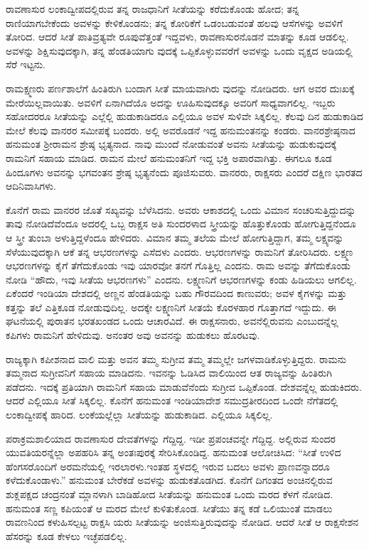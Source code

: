 ರಾವಣಾಸುರ ಲಂಕಾದ್ವೀಪದಲ್ಲಿರುವ ತನ್ನ ರಾಜಧಾನಿಗೆ ಸೀತೆಯನ್ನು ಕರೆದುಕೊಂಡು ಹೋದ; ತನ್ನ ರಾಣಿಯಾಗಬೇಕೆಂದು ಅವಳನ್ನು ಕೇಳಿಕೊಂಡನು; ತನ್ನ ಕೋರಿಕೆಗೆ ಒಡಂಬಡುವಂತೆ ಹಲವು ಆಸೆಗಳನ್ನು ಅವಳಿಗೆ ತೋರಿದ. ಆದರೆ ಸೀತೆ ಪಾತಿವ್ರತ್ಯವೇ ರೂಪುವೆತ್ತಂತೆ ಇದ್ದವಳು, ರಾವಣಾಸುರನೊಡನೆ ಮಾತನ್ನು ಕೂಡ ಆಡಲಿಲ್ಲ. ಅವಳನ್ನು ಶಿಕ್ಷಿಸುವುದಕ್ಕಾಗಿ, ತನ್ನ ಹೆಂಡತಿಯಾಗು ವುದಕ್ಕೆ ಒಪ್ಪಿಕೊಳ್ಳುವವರೆಗೆ ಅವಳನ್ನು ಒಂದು ವೃಕ್ಷದ ಅಡಿಯಲ್ಲಿ ಸೆರೆ ಇಟ್ಟನು.

ರಾಮಕ್ಷ್ಮಣರು ಪರ್ಣಶಾಲೆಗೆ ಹಿಂತಿರುಗಿ ಬಂದಾಗ ಸೀತೆ ಮಾಯವಾಗಿರು ವುದನ್ನು ನೋಡಿದರು. ಆಗ ಅವರ ದುಃಖಕ್ಕೆ ಮೇರೆಯಿಲ್ಲವಾಯಿತು. ಅವಳಿಗೆ ಏನಾಗಿದೆಯೊ ಅದನ್ನು ಊಹಿಸುವುದಕ್ಕೂ ಅವರಿಗೆ ಸಾಧ್ಯವಾಗಲಿಲ್ಲ. ಇಬ್ಬರು ಸಹೋದರರೂ ಸೀತೆಯನ್ನು ಎಲ್ಲೆಲ್ಲಿ ಹುಡುಕಾಡಿದರೂ ಎಲ್ಲಿಯೂ ಅವಳ ಸುಳಿವೇ ಸಿಕ್ಕಲಿಲ್ಲ. ಕೆಲವು ದಿನ ಹುಡುಕಾಡಿದ ಮೇಲೆ ಕೆಲವು ವಾನರರ ಸಮೀಪಕ್ಕೆ ಬಂದರು. ಅಲ್ಲಿ ಅವರೊಡನೆ ಇದ್ದ ಹನುಮಂತನನ್ನು ಕಂಡರು. ವಾನರಶ್ರೇಷ್ಠನಾದ ಹನುಮಂತ ಶ‍್ರೀರಾಮನ ಶ್ರೇಷ್ಠ ಭೃತ್ಯನಾದ. ನಾವು ಮುಂದೆ ನೋಡುವಂತೆ ಅವನು ಸೀತೆಯನ್ನು ಹುಡುಕುವುದಕ್ಕೆ ರಾಮನಿಗೆ ಸಹಾಯ ಮಾಡಿದ. ರಾಮನ ಮೇಲೆ ಹನುಮಂತನಿಗೆ ಇದ್ದ ಭಕ್ತಿ ಅಪಾರವಾಗಿತ್ತು. ಈಗಲೂ ಕೂಡ ಹಿಂದೂಗಳು ಅವನನ್ನು ಭಗವಂತನ ಶ್ರೇಷ್ಠ ಭೃತ್ಯನೆಂದು ಪೂಜಿಸುವರು. ವಾನರರು, ರಾಕ್ಷಸರು ಎಂದರೆ ದಕ್ಷಿಣ ಭಾರತದ ಆದಿನಿವಾಸಿಗಳು.

ಕೊನೆಗೆ ರಾಮ ವಾನರರ ಜೊತೆ ಸಖ್ಯವನ್ನು ಬೆಳೆಸಿದನು. ಅವರು ಆಕಾಶದಲ್ಲಿ ಒಂದು ವಿಮಾನ ಸಂಚರಿಸುತ್ತಿದ್ದುದನ್ನು ತಾವು ನೋಡಿದೆವೆಂದೂ ಅದರಲ್ಲಿ ಒಬ್ಬ ರಾಕ್ಷಸ ಅತಿ ಸುಂದರಳಾದ ಸ್ತ್ರೀಯನ್ನು ಹೊತ್ತುಕೊಂಡು ಹೋಗುತ್ತಿದ್ದನೆಂದೂ ಆ ಸ್ತ್ರೀ ತುಂಬಾ ಅಳುತ್ತಿದ್ದಳೆಂದೂ ಹೇಳಿದರು. ವಿಮಾನ ತಮ್ಮ ತಲೆಯ ಮೇಲೆ ಹೋಗುತ್ತಿದ್ದಾಗ, ತಮ್ಮ ಲಕ್ಷ್ಯವನ್ನು ಸೆಳೆಯುವುದಕ್ಕಾಗಿ ಆಕೆ ತನ್ನ ಆಭರಣಗಳನ್ನು ಎಸೆದಳು ಎಂದರು. ಆಭರಣಗಳನ್ನು ರಾಮನಿಗೆ ತೋರಿಸಿದರು. ಲಕ್ಷ್ಮಣ ಆಭರಣಗಳನ್ನು ಕೈಗೆ ತೆಗೆದುಕೊಂಡು ಇವು ಯಾರವೋ ತನಗೆ ಗೊತ್ತಿಲ್ಲ ಎಂದನು. ರಾಮ ಅವನ್ನು ತೆಗೆದುಕೊಂಡು ನೋಡಿ “ಹೌದು, ಇವು ಸೀತೆಯ ಆಭರಣಗಳು” ಎಂದನು. ಲಕ್ಷ್ಮಣನಿಗೆ ಆಭರಣಗಳನ್ನು ಕಂಡು ಹಿಡಿಯಲು ಆಗಲಿಲ್ಲ. ಏಕೆಂದರೆ ಇಂಡಿಯಾ ದೇಶದಲ್ಲಿ ಅಣ್ಣನ ಹೆಂಡತಿಯನ್ನು ಬಹು ಗೌರವದಿಂದ ಕಾಣುವರು; ಅವಳ ಕೈಗಳನ್ನು ಮತ್ತು ಕತ್ತನ್ನು ತಲೆ ಎತ್ತಿಕೂಡ ನೋಡುವುದಿಲ್ಲ. ಅದಕ್ಕೇ ಲಕ್ಷ್ಮಣನಿಗೆ ಸೀತಯೆ ಕೊರಳಹಾರ ಗೊತ್ತಾಗದೆ ಇದ್ದುದು. ಈ ಘಟನೆಯಲ್ಲಿ ಪುರಾತನ ಭರತಖಂಡದ ಒಂದು ಆಚಾರವಿದೆ. ಈ ರಾಕ್ಷಸನಾರು, ಅವನೆಲ್ಲಿರುವನು ಎಂಬುದನ್ನೆಲ್ಲ ಕಪಿಗಳು ರಾಮನಿಗೆ ಹೇಳಿದುವು. ಅನಂತರ ಅವು ಅವನನ್ನು ಹುಡುಕಲು ಹೊರಟವು.

ರಾಜ್ಯಕ್ಕಾಗಿ ಕಪೀಶನಾದ ವಾಲಿ ಮತ್ತು ಅವನ ತಮ್ಮ ಸುಗ್ರೀವ ತಮ್ಮ ತಮ್ಮಲ್ಲೇ ಜಗಳವಾಡಿಕೊಳ್ಳುತ್ತಿದ್ದರು. ರಾಮನು ತಮ್ಮನಾದ ಸುಗ್ರೀವನಿಗೆ ಸಹಾಯ ಮಾಡಿದನು. ಇವನನ್ನು ಓಡಿಸಿದ ವಾಲಿಯಿಂದ ಆತ ರಾಜ್ಯವನ್ನು ಹಿಂತಿರುಗಿ ಪಡೆದನು. ಇದಕ್ಕೆ ಪ್ರತಿಯಾಗಿ ರಾಮನಿಗೆ ಸಹಾಯ ಮಾಡುವೆನೆಂದು ಸುಗ್ರೀವ ಒಪ್ಪಿಕೊಂಡ. ದೇಶವನ್ನೆಲ್ಲ ಹುಡುಕಿದರು. ಆದರೆ ಎಲ್ಲಿಯೂ ಸೀತೆ ಸಿಕ್ಕಲಿಲ್ಲ. ಕೊನೆಗೆ ಹನುಮಂತ ಇಂಡಿಯಾದೇಶ ಸಮುದ್ರತೀರದಿಂದ ಒಂದೇ ನೆಗೆತದಲ್ಲಿ ಲಂಕಾದ್ವೀಪಕ್ಕೆ ಹಾರಿದ. ಲಂಕೆಯಲ್ಲೆಲ್ಲಾ ಸೀತೆಯನ್ನು ಹುಡುಕಾಡಿದ. ಎಲ್ಲಿಯೂ ಸಿಕ್ಕಲಿಲ್ಲ.

ಪರಾಕ್ರಮಶಾಲಿಯಾದ ರಾವಣಾಸುರ ದೇವತೆಗಳನ್ನು ಗೆದ್ದಿದ್ದ. ಇಡೀ ಪ್ರಪಂಚವನ್ನೇ ಗೆದ್ದಿದ್ದ. ಅಲ್ಲಿರುವ ಸುಂದರ ಯುವತಿಯರನ್ನೆಲ್ಲಾ ಅಪಹರಿಸಿ ತನ್ನ ಅಂತಃಪುರಕ್ಕೆ ಸೇರಿಸಿಕೊಂಡಿದ್ದ. ಹನುಮಂತ ಆಲೋಚಿಸಿದ: “ಸೀತೆ ಉಳಿದ ಹೆಂಗಸರೊಂದಿಗೆ ಅರಮನೆಯಲ್ಲಿ ಇರಲಾರಳು.ಇಂತಹ ಸ್ಥಳದಲ್ಲಿ ಇರುವ ಬದಲು ಅವಳು ಪ್ರಾಣವನ್ನಾದರೂ ಕಳೆದುಕೊಂಡಾಳು.” ಹನುಮಂತ ಬೇರೆಕಡೆ ಅವಳನ್ನು ಹುಡುಕತೊಡಗಿದ. ಕೊನೆಗೆ ದಿಗಂತದ ಅಂಚಿನಲ್ಲಿರುವ ಶುಕ್ಲಪಕ್ಷದ ಚಂದ್ರನಂತೆ ಮ್ಲಾನಳಾಗಿ ಬಾಡಿಹೋದ ಸೀತೆಯನ್ನು ಹನುಮಂತ ಒಂದು ಮರದ ಕೆಳಗೆ ನೋಡಿದ. ಹನುಮಂತ ಸಣ್ಣ ಕಪಿಯಂತೆ ಆ ಮರದ ಮೇಲೆ ಕುಳಿತುಕೊಂಡ. ಸೀತೆಯು ತನ್ನ ಕಡೆ ಒಲಿಯುಂತೆ ಮಾಡಲು ರಾವಣನಿಂದ ಕಳುಹಿಸಲ್ಪಟ್ಟ ರಾಕ್ಷಸಿ ಯರು ಸೀತೆಯನ್ನು ಅಂಜಿಸುತ್ತಿರುವುದನ್ನು ನೋಡಿದ. ಆದರೆ ಸೀತೆ ಆ ರಾಕ್ಷಸೇಶನ ಹೆಸರನ್ನು ಕೂಡ ಕೇಳಲು ಇಚ್ಛೆಪಡಲಿಲ್ಲ.

